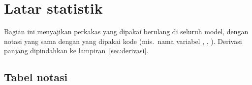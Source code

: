 \section{Latar statistik}\label{sec:latar}

Bagian ini menyajikan perkakas yang dipakai berulang di seluruh model, dengan
notasi yang sama dengan yang dipakai kode (mis.\ nama variabel
, , ). Derivasi panjang dipindahkan ke
lampiran~\ref{sec:derivasi}.

\subsection{Tabel notasi}\label{sec:notasi}

